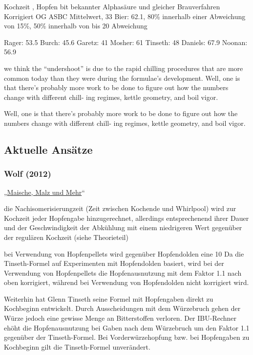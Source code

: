 \documentclass[a4paper,parskip=half]{scrartcl}
\begin{document}
\parencite{Bonham2001}
Kochzeit , Hopfen bit bekannter Alphasäure und gleicher Brauverfahren
Korrigiert OG
ASBC Mittelwert, 33 Bier: 62.1, 80\% innerhalb einer Abweichung von 15\%, 50\% innerhalb
von  bis 20 Abweichung

Rager: 53.5
Burch: 45.6
Garetz: 41
Mosher: 61
Tinseth: 48
Daniels: 67.9
Noonan: 56.9

\parencite[65]{Beechum2017}
we think the “undershoot” is due to the
rapid chilling procedures that are more
common today than they were during the
formulae’s development.
Well,
one is that there’s probably more work
to be done to figure out how the
numbers change with different chill-
ing regimes, kettle geometry, and boil
vigor.

Well,
one is that there’s probably more work
to be done to figure out how the
numbers change with different chill-
ing regimes, kettle geometry, and boil
vigor.



\subsection*{Aktuelle Ansätze}

\subsubsection*{Wolf (2012)}

„\href{https://www.maischemalzundmehr.de/index.php?inhaltmitte=toolsiburechner}{Maische, Malz und Mehr}“

die Nachisomerisierungzeit (Zeit zwischen Kochende und Whirlpool) wird zur Kochzeit jeder Hopfengabe hinzugerechnet, allerdings entsprechenend ihrer Dauer und der Geschwindigkeit der Abkühlung mit einem niedrigeren Wert gegenüber der regulären Kochzeit (siehe Theorieteil) 

bei Verwendung von Hopfenpellets wird gegenüber Hopfendolden eine 10%
Da die Tinseth-Formel auf Experimenten mit Hopfendolden basiert, wird bei der Verwendung von Hopfenpellets die Hopfenausnutzung mit dem Faktor 1.1 nach oben korrigiert, während bei Verwendung von Hopfendolden nicht korrigiert wird. 

Weiterhin hat Glenn Tinseth seine Formel mit Hopfengaben direkt zu Kochbeginn entwickelt. Durch Ausscheidungen mit dem Würzebruch gehen der Würze jedoch eine gewisse Menge an Bitterstoffen verloren. Der IBU-Rechner ehöht die Hopfenausnutzung bei Gaben nach dem Würzebruch um den Faktor 1.1 gegenüber der Tinseth-Formel. Bei Vorderwürzehopfung bzw. bei Hopfengaben zu Kochbeginn gilt die Tinseth-Formel unverändert. 
\end{document}
